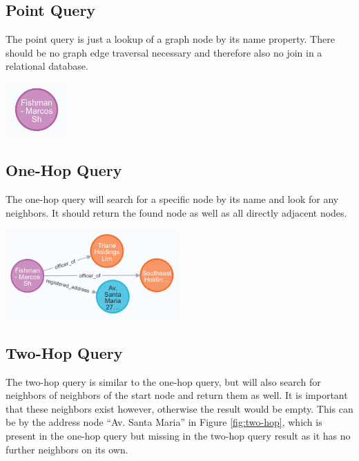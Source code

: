 \documentclass[11pt, a4paper,oneside,chapterprefix=false]{scrbook}
\begin{document}
\subsection{Point Query}

The point query is just a lookup of a graph node by its name property.
There should be no graph edge traversal necessary and therefore also no join in a relational database.

\begin{center}
\includegraphics*[width=0.175\textwidth]{figures/query-point.png}
\end{center}
\newpage
\subsection{One-Hop Query}

The one-hop query will search for a specific node by its name and look for any neighbors. It should return the found node as well as all directly adjacent nodes.

\begin{center}
\includegraphics*[width=0.5\textwidth]{figures/query-one-hop.png}
 \label{fig:two-hop}
\end{center}

\subsection{Two-Hop Query}

The two-hop query is similar to the one-hop query, but will also search for neighbors of neighbors of the start node and return them as well. 
It is important that these neighbors exist however, otherwise the result would be empty.
This can be by the address node ``Av. Santa Maria'' in Figure \ref{fig:two-hop}, which is present in the one-hop query but missing in the two-hop query result as it has no further neighbors on its own.
\end{document}
